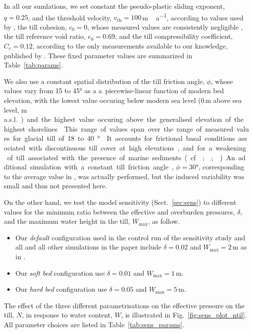 \documentclass[tc, manuscript]{copernicus}
\begin{document}
      In all our sumlations, we set constant the pseudo-plastic sliding
      exponent, $q=0.25$, and the threshold velocity,
      $v_{\text{th}}=100$\,\unit{m\,a^{-1}}, according to values used by
      \citet{Aschwanden.etal.2013}, the till cohesion, $c_0=0$, whose
      measured values are consistently negligible
      \citep[p.~268]{Tulaczyk.etal.2000, Cuffey.Paterson.2010}, the till
      reference void ratio, $e_0=0.69$, and the till compressibility
      coefficient, $C_{\mathrm{c}}=0.12$, according to the only measurements
      available to our knowledge, published by \citep{Tulaczyk.etal.2000}.
      These fixed parameter values are summarized in Table~\ref{tab:params}.

      We also use a constant spatial distribution of the till friction
      angle, $\phi$, whose values vary from 15 to 45\unit{\degree} as a
      a~piecewise-linear function of modern bed elevation, with the lowest
      value occuring below modern sea level (0\,\unit{m} above sea level,
      \unit{m\,a.s.l.}) and the highest value occuring above the generalised
      elevation of the highest shorelines
      \citep[200\,\unit{m\,a.s.l.},][Fig.~5]{Clague.1981}. This range of
      values span over the range of measured values for glacial till of 18
      to 40\unit{\degree} \citep[p.~268]{Cuffey.Paterson.2010}. It accounts
      for frictional basal conditions associated with discontinuous till
      cover at high elevations, and for a~weakening of till associated with
      the presence of marine sediments (cf. \citealp{Martin.etal.2011};
      \citealp[Supplement]{Aschwanden.etal.2013};
      \citealp{PISM-authors.2015}).

      An additional simulation with a constant till friction angle,
      $\phi=30$\unit{\degree}, corresponding to the average value in
      \citet[p.~268]{Cuffey.Paterson.2010}, was actually performed, but the
      induced variability was small and thus not presented here.

      On the other hand, we test the model sensitivity
      (Sect.~\ref{sec:sens}) to different values for the minimum ratio
      between the effective and overburden pressures, $\delta$, and the
      maximum water height in the till, $W_{\text{max}}$, as follow.
%
\begin{itemize}
  \item Our \emph{default} configuration used in the control run of the
    sensitivity study and all and all other simulations in the paper include
    $\delta=0.02$ and $W_{\text{max}}=2$\,\unit{m} as in
    \citet{Bueler.Pelt.2015}.
  \item Our \emph{soft bed} configuration use $\delta=0.01$ and
    $W_{\text{max}}=1$\,\unit{m}.
  \item Our \emph{hard bed} configuration use $\delta=0.05$ and
    $W_{\text{max}}=5$\,\unit{m}.
\end{itemize}
%
      The effect of the three different parametrisations on the effective
      pressure on the till, $N$, in response to water content, $W$, is
      illustrated in Fig.~\ref{fig:sens_plot_ntil}. All parameter choices
      are listed in Table~\ref{tab:sens_params}.
\end{document}
